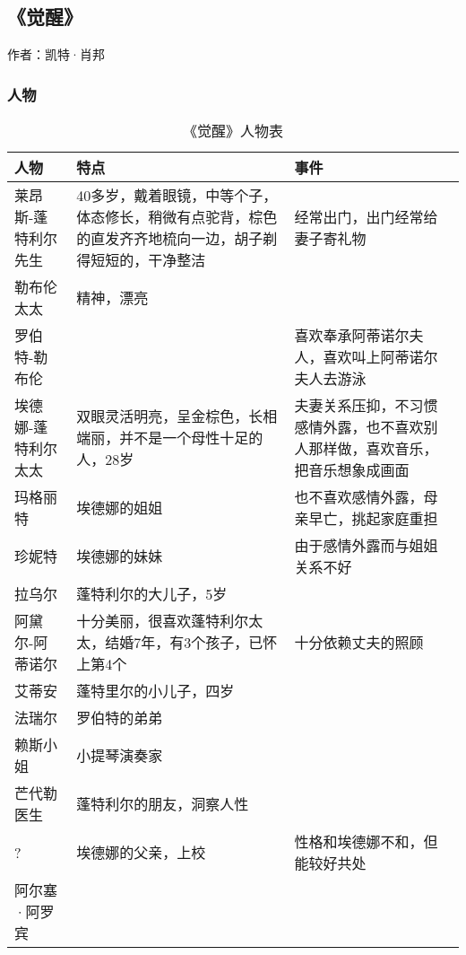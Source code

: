 \subsection{《觉醒》}

作者：凯特·肖邦

\subsubsection{人物}
\begin{table}[htb]
    \centering
    \caption{《觉醒》人物表}
    \begin{tabular}{p{}|p{}|p{}}
人物 & 特点 & 事件 \\
\hline
莱昂斯-蓬特利尔先生 & 40多岁，戴着眼镜，中等个子，体态修长，稍微有点驼背，棕色的直发齐齐地梳向一边，胡子剃得短短的，干净整洁 & 经常出门，出门经常给妻子寄礼物 \\
勒布伦太太 & 精神，漂亮	& \\
罗伯特-勒布伦 & & 喜欢奉承阿蒂诺尔夫人，喜欢叫上阿蒂诺尔夫人去游泳\\
埃德娜-蓬特利尔太太 & 双眼灵活明亮，呈金棕色，长相端丽，并不是一个母性十足的人，28岁 & 夫妻关系压抑，不习惯感情外露，也不喜欢别人那样做，喜欢音乐，把音乐想象成画面 \\
玛格丽特 & 埃德娜的姐姐 & 也不喜欢感情外露，母亲早亡，挑起家庭重担 \\
珍妮特 & 埃德娜的妹妹 & 由于感情外露而与姐姐关系不好 \\
拉乌尔 & 蓬特利尔的大儿子，5岁	& \\
阿黛尔-阿蒂诺尔 & 十分美丽，很喜欢蓬特利尔太太，结婚7年，有3个孩子，已怀上第4个 & 十分依赖丈夫的照顾 \\
艾蒂安 & 蓬特里尔的小儿子，四岁	& \\
法瑞尔 & 罗伯特的弟弟 & \\
赖斯小姐 & 小提琴演奏家	 & \\
芒代勒医生 & 蓬特利尔的朋友，洞察人性 & \\
? & 埃德娜的父亲，上校 & 性格和埃德娜不和，但能较好共处 \\
阿尔塞·阿罗宾 & & \\
\hline
    \end{tabular}
\end{table}	

